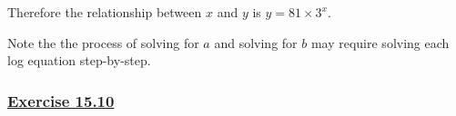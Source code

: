 \documentclass[
  11pt,
  openany]{book}
\begin{document}
Therefore the relationship between \(x\) and \(y\) is \(y=81\times3^x\).

Note the the process of solving for \(a\) and solving for \(b\) may require solving each log equation step-by-step.

\pagebreak

\newpage

\label{ex1510q}{}

\subsubsection*{\texorpdfstring{\hyperref[ex1510a]{Exercise 15.10}}{Exercise 15.10}}\label{exercise-15.10}

\vspace{-0.5cm}
\end{document}
